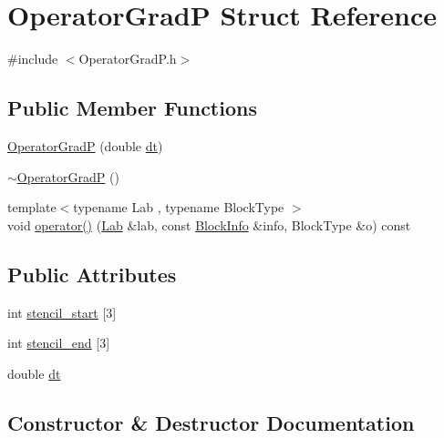 \hypertarget{struct_operator_grad_p}{}\section{Operator\+Grad\+P Struct Reference}
\label{struct_operator_grad_p}


{\ttfamily \#include $<$Operator\+Grad\+P.\+h$>$}

\subsection*{Public Member Functions}
\begin{DoxyCompactItemize}
\item 
\hyperlink{struct_operator_grad_p_a90f6bdde5a07401f14be380ef6cf13e0}{Operator\+Grad\+P} (double \hyperlink{struct_operator_grad_p_a86a7e584cdd5928d1bc34fecd276783e}{dt})
\item 
\hyperlink{struct_operator_grad_p_a1e88f7317d635f1f842158663b197911}{$\sim$\+Operator\+Grad\+P} ()
\item 
{\footnotesize template$<$typename Lab , typename Block\+Type $>$ }\\void \hyperlink{struct_operator_grad_p_a0783ffd9da959ff251913634ebd16487}{operator()} (\hyperlink{_definitions_8h_ad6f951af9a2a6ebc1975404882b34314}{Lab} \&lab, const \hyperlink{struct_block_info}{Block\+Info} \&info, Block\+Type \&o) const 
\end{DoxyCompactItemize}
\subsection*{Public Attributes}
\begin{DoxyCompactItemize}
\item 
int \hyperlink{struct_operator_grad_p_ab5d816eb1f3e6fea8946e0a31869e51f}{stencil\+\_\+start} \mbox{[}3\mbox{]}
\item 
int \hyperlink{struct_operator_grad_p_a62999b18820358c568c86636716379f7}{stencil\+\_\+end} \mbox{[}3\mbox{]}
\item 
double \hyperlink{struct_operator_grad_p_a86a7e584cdd5928d1bc34fecd276783e}{dt}
\end{DoxyCompactItemize}


\subsection{Constructor \& Destructor Documentation}
\hypertarget{struct_operator_grad_p_a90f6bdde5a07401f14be380ef6cf13e0}{}
